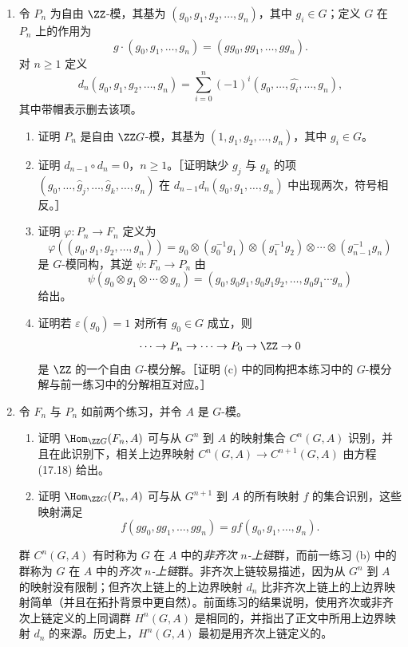 \begin{enumerate}[label=\arabic*.]
  \item 令 $P_n$ 为自由 $\ZZ$-模，其基为 $(g_0,g_1,g_2,
  \ldots,g_n)$，其中 $g_i\in G$；定义 $G$ 在 $P_n$ 上的作用为
  \[
    g\cdot(g_0,g_1,
    \ldots,g_n)=(gg_0,gg_1,
    \ldots,gg_n).
  \]
  对 $n\geq1$ 定义
  \[
    d_n(g_0,g_1,g_2,
    \ldots,g_n)=\sum_{i=0}^n(-1)^i(g_0,
    \ldots,\widehat{g_i},
    \ldots,g_n),
  \]
  其中带帽表示删去该项。
  \begin{enumerate}[label=(\alph*)]
    \item 证明 $P_n$ 是自由 $\ZZ G$-模，其基为 $(1,g_1,g_2,
    \ldots,g_n)$，其中 $g_i\in G$。
    \item 证明 $d_{n-1}\circ d_n=0$，$n\geq1$。［证明缺少 $g_j$ 与 $g_k$ 的项 $(g_0,
    \ldots,
    \widehat g_j,
    \ldots,
    \widehat g_k,
    \ldots,g_n)$ 在 $d_{n-1}d_n(g_0,g_1,
    \ldots,g_n)$ 中出现两次，符号相反。］
    \item 证明 $\varphi:P_n\to F_n$ 定义为
    \[
      \varphi((g_0,g_1,g_2,
      \ldots,g_n))=g_0\otimes(g_0^{-1}g_1)\otimes(g_1^{-1}g_2)\otimes\cdots\otimes(g_{n-1}^{-1}g_n)
    \]
    是 $G$-模同构，其逆 $\psi:F_n\to P_n$ 由
    \[
      \psi(g_0\otimes g_1\otimes\cdots\otimes g_n)=(g_0,g_0g_1,g_0g_1g_2,
      \ldots,g_0g_1\cdots g_n)
    \]
    给出。
    \item 证明若 $\varepsilon(g_0)=1$ 对所有 $g_0\in G$ 成立，则
    \[
      \cdots\to P_n\to\cdots\to P_0\to\ZZ\to0
    \]
    是 $\ZZ$ 的一个自由 $G$-模分解。［证明 (c) 中的同构把本练习中的 $G$-模分解与前一练习中的分解相互对应。］
  \end{enumerate}

  \item 令 $F_n$ 与 $P_n$ 如前两个练习，并令 $A$ 是 $G$-模。
  \begin{enumerate}[label=(\alph*)]
    \item 证明 $\Hom_{\ZZ G}(F_n,A)$ 可与从 $G^n$ 到 $A$ 的映射集合 $C^n(G,A)$ 识别，并且在此识别下，相关上边界映射 $C^n(G,A)\to C^{n+1}(G,A)$ 由方程 (17.18) 给出。
    \item 证明 $\Hom_{\ZZ G}(P_n,A)$ 可与从 $G^{n+1}$ 到 $A$ 的所有映射 $f$ 的集合识别，这些映射满足
    \[
      f(gg_0,gg_1,
      \ldots,gg_n)=gf(g_0,g_1,
      \ldots,g_n).
    \]
  \end{enumerate}
  群 $C^n(G,A)$ 有时称为 $G$ 在 $A$ 中的\emph{非齐次 $n$-上链}群，而前一练习 (b) 中的群称为 $G$ 在 $A$ 中的\emph{齐次 $n$-上链}群。非齐次上链较易描述，因为从 $G^n$ 到 $A$ 的映射没有限制；但齐次上链上的上边界映射 $d_n$ 比非齐次上链上的上边界映射简单（并且在拓扑背景中更自然）。前面练习的结果说明，使用齐次或非齐次上链定义的上同调群 $H^n(G,A)$ 是相同的，并指出了正文中所用上边界映射 $d_n$ 的来源。历史上，$H^n(G,A)$ 最初是用齐次上链定义的。


\end{enumerate}
